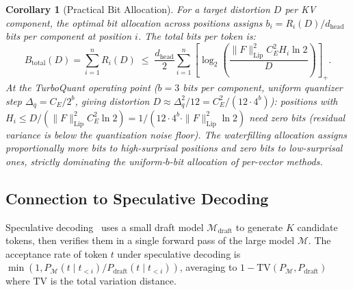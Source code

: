\documentclass[11pt]{article}
\newtheorem{corollary}{Corollary}
\begin{document}
\begin{corollary}[Practical Bit Allocation]
\label{cor:bit_alloc}
For a target distortion $D$ per KV component, the optimal bit allocation
across positions assigns $b_i = R_i(D) / d_{\mathrm{head}}$ bits per component
at position $i$.  The total bits per token is:
\[
  B_{\mathrm{total}}(D) = \sum_{i=1}^n R_i(D)
  \;\leq\; \frac{d_{\mathrm{head}}}{2} \sum_{i=1}^n
  \left[\log_2\!\left(\frac{\|F\|_{\mathrm{Lip}}^2 C_E^2 H_i \ln 2}{D}\right)\right]_+.
\]
At the TurboQuant operating point ($b = 3$ bits per component,
uniform quantizer step $\Delta_q = C_E/2^b$, giving distortion
$D \approx \Delta_q^2/12 = C_E^2/(12 \cdot 4^b)$):
positions with $H_i \leq D / (\|F\|_{\mathrm{Lip}}^2 C_E^2 \ln 2)
= 1/(12 \cdot 4^b \cdot \|F\|_{\mathrm{Lip}}^2 \ln 2)$ need \emph{zero bits}
(residual variance is below the quantization noise floor).
The waterfilling allocation assigns proportionally more bits to high-surprisal
positions and zero bits to low-surprisal ones, strictly dominating the
uniform-$b$-bit allocation of per-vector methods.
\end{corollary}

\subsection{Connection to Speculative Decoding}

Speculative decoding~\cite{leviathan2023speculative} uses a small draft model
$\mathcal{M}_{\mathrm{draft}}$ to generate $K$ candidate tokens, then verifies
them in a single forward pass of the large model $\mathcal{M}$.  The acceptance
rate of token $t$ under speculative decoding is
$\min(1, P_{\mathcal{M}}(t \mid t_{<i}) / P_{\mathrm{draft}}(t \mid t_{<i}))$,
averaging to $1 - \mathrm{TV}(P_{\mathcal{M}}, P_{\mathrm{draft}})$ where TV
is the total variation distance.
\end{document}
